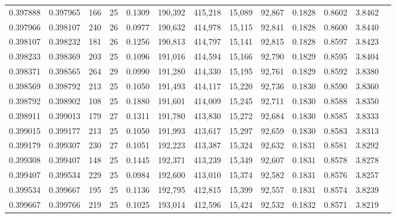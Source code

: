 \begin{tabular}{rrrrrrrrrrrrr}
0.397888 & 0.397965 & 166 &  25 &                                     0.1309 & 190,392 & 415,218 &  15,089 &  92,867 & 0.1828 & 0.8602 & 3.8462 \\
0.397966 & 0.398107 & 240 &  26 &                                     0.0977 & 190,632 & 414,978 &  15,115 &  92,841 & 0.1828 & 0.8600 & 3.8440 \\
0.398107 & 0.398232 & 181 &  26 &                                     0.1256 & 190,813 & 414,797 &  15,141 &  92,815 & 0.1828 & 0.8597 & 3.8423 \\
0.398233 & 0.398369 & 203 &  25 &                                     0.1096 & 191,016 & 414,594 &  15,166 &  92,790 & 0.1829 & 0.8595 & 3.8404 \\
0.398371 & 0.398565 & 264 &  29 &                                     0.0990 & 191,280 & 414,330 &  15,195 &  92,761 & 0.1829 & 0.8592 & 3.8380 \\
0.398569 & 0.398792 & 213 &  25 &                                     0.1050 & 191,493 & 414,117 &  15,220 &  92,736 & 0.1830 & 0.8590 & 3.8360 \\
0.398792 & 0.398902 & 108 &  25 &                                     0.1880 & 191,601 & 414,009 &  15,245 &  92,711 & 0.1830 & 0.8588 & 3.8350 \\
0.398911 & 0.399013 & 179 &  27 &                                     0.1311 & 191,780 & 413,830 &  15,272 &  92,684 & 0.1830 & 0.8585 & 3.8333 \\
0.399015 & 0.399177 & 213 &  25 &                                     0.1050 & 191,993 & 413,617 &  15,297 &  92,659 & 0.1830 & 0.8583 & 3.8313 \\
0.399179 & 0.399307 & 230 &  27 &                                     0.1051 & 192,223 & 413,387 &  15,324 &  92,632 & 0.1831 & 0.8581 & 3.8292 \\
0.399308 & 0.399407 & 148 &  25 &                                     0.1445 & 192,371 & 413,239 &  15,349 &  92,607 & 0.1831 & 0.8578 & 3.8278 \\
0.399407 & 0.399534 & 229 &  25 &                                     0.0984 & 192,600 & 413,010 &  15,374 &  92,582 & 0.1831 & 0.8576 & 3.8257 \\
0.399534 & 0.399667 & 195 &  25 &                                     0.1136 & 192,795 & 412,815 &  15,399 &  92,557 & 0.1831 & 0.8574 & 3.8239 \\
0.399667 & 0.399766 & 219 &  25 &                                     0.1025 & 193,014 & 412,596 &  15,424 &  92,532 & 0.1832 & 0.8571 & 3.8219 \\

\end{tabular}
